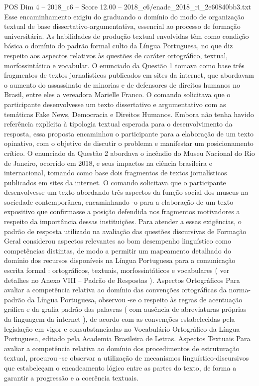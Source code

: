 \begin{textsample}{POS Dim 4 – 2018\_c6 – Score 12.00 – 2018\_c6/enade\_2018\_ri\_2e60840bb3.txt}
Esse encaminhamento exigiu do graduando o domínio do modo de organização textual de base dissertativo-argumentativa, essencial ao processo de formação universitária.
As habilidades de produção textual envolvidas têm como condição básica o domínio do padrão formal culto da Língua Portuguesa, no que diz respeito aos aspectos relativos às questões de caráter ortográfico, textual, morfossintático e vocabular.
O enunciado da Questão 1 tomava como base três fragmentos de textos jornalísticos publicados em sites da internet, que abordavam o aumento do assassinato de minorias e de defensores de direitos humanos no Brasil, entre eles a vereadora Marielle Franco.
O comando solicitava que o participante desenvolvesse um texto dissertativo e argumentativo com as temáticas Fake News, Democracia e Direitos Humanos.
Embora não tenha havido referência explícita à tipologia textual esperada para o desenvolvimento da resposta, essa proposta encaminhou o participante para a elaboração de um texto opinativo, com o objetivo de discutir o problema e manifestar um posicionamento crítico.
O enunciado da Questão 2 abordava o incêndio do Museu Nacional do Rio de Janeiro, ocorrido em 2018, e seus impactos na ciência brasileira e internacional, tomando como base dois fragmentos de textos jornalísticos publicados em sites da internet.
O comando solicitava que o participante desenvolvesse um texto abordando três aspectos da função social dos museus na sociedade contemporânea, encaminhando -o para a elaboração de um texto expositivo que confirmasse a posição defendida nos fragmentos motivadores a respeito da importância dessas instituições.
Para atender a essas exigências, o padrão de resposta utilizado na avaliação das questões discursivas de Formação Geral considerou aspectos relevantes ao bom desempenho linguístico como competências distintas, de modo a permitir um mapeamento detalhado do domínio dos recursos disponíveis na Língua Portuguesa para a comunicação escrita formal : ortográficos, textuais, morfossintáticos e vocabulares ( ver detalhes no Anexo VIII – Padrão de Respostas ).
Aspectos Ortográficos Para avaliar a competência relativa ao domínio das convenções ortográficas da norma-padrão da Língua Portuguesa, observou -se o respeito às regras de acentuação gráfica e da grafia padrão das palavras ( com ausência de abreviaturas próprias da linguagem da internet ), de acordo com as convenções estabelecidas pela legislação em vigor e consubstanciadas no Vocabulário Ortográfico da Língua Portuguesa, editado pela Academia Brasileira de Letras.
Aspectos Textuais Para avaliar a competência relativa ao domínio dos procedimentos de estruturação textual, procurou -se observar a utilização de mecanismos linguístico-discursivos que estabeleçam o encadeamento lógico entre as partes do texto, de forma a garantir a progressão e a coerência textuais.

\end{textsample}
